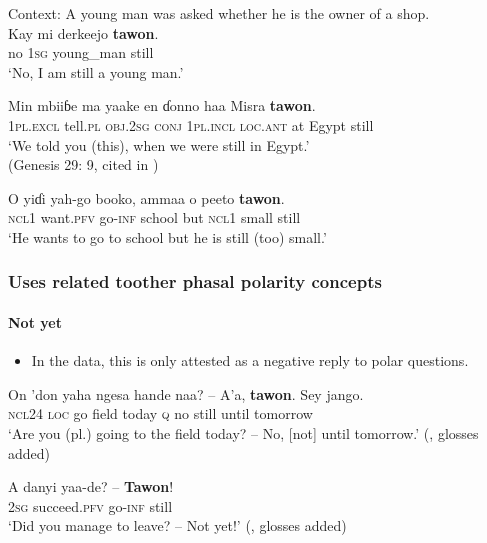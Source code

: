 \begin{exe}
	\ex
	Context: A young man was asked whether he is the owner of a shop.\\
	\gll Kay mi derkeejo \textbf{tawon}.\\
	no 1\textsc{sg} young\_man still\\
	\glt \lq No, I am still a young man.' \parencite[250]{Kramer2021Adamawa}

	\ex
	\gll Min mbiiɓe ma yaake en ɗonno haa Misra \textbf{tawon}.\\
	1\textsc{pl}.\textsc{excl} tell.\textsc{pl} \textsc{obj}.2\textsc{sg} \textsc{conj} 1\textsc{pl}.\textsc{incl} \textsc{loc}.\textsc{ant} at Egypt still\\
	\glt \lq We told you (this), when we were still in Egypt.'
	\\(Genesis 29: 9, cited in \cite[250]{Kramer2021Adamawa})
	
	\ex
	\gll O yiɗi yah-go booko, ammaa o peeto \textbf{tawon}.\\
	\textsc{ncl}1 want.\textsc{pfv} go-\textsc{inf} school but \textsc{ncl}1 small still\\
	\glt \lq He wants to go to school but he is still (too) small.\rq{ }\parencite[250]{Kramer2021Adamawa}
\end{exe}

\subsubsection{Uses related toother phasal polarity concepts}
\paragraph{Not yet}\label{appendixAdamawaNotYet}
\begin{itemize}
	\item In the data, this is only attested as a negative reply to polar questions.
\end{itemize}

\begin{exe}
	\ex
	\gll On 'don yaha ngesa hande naa? – A'a, \textbf{tawon}. Sey jango.\\
	\textsc{ncl}24 \textsc{loc} go field today \textsc{q} {} no still until tomorrow\\
	\glt \lq Are you (pl.) going to the field today? -- No, [not] until tomorrow.' (\cite[122]{PelletierSkinner1981}, glosses added)

	\ex
	\gll A danyi yaa-de? – \textbf{Tawon}!\\
	2\textsc{sg} succeed.\textsc{pfv} go-\textsc{inf} {} still\\
	\glt \lq Did you manage to leave? -- Not yet!\rq{ }(\cite[s.v. \textit{yet}]{deWolf1995}, glosses added)
\end{exe}


